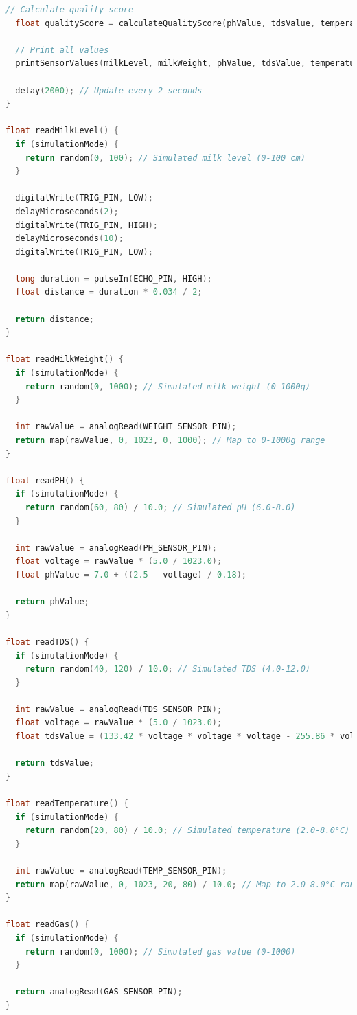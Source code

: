 \documentclass[12pt,a4paper]{article}
\begin{document}
\begin{lstlisting}[language=C++, basicstyle=\ttfamily\small, breaklines=true, frame=single, caption={Full Arduino Code for Milk Monitoring System}]
  // Calculate quality score
  float qualityScore = calculateQualityScore(phValue, tdsValue, temperature, gasValue);
  
  // Print all values
  printSensorValues(milkLevel, milkWeight, phValue, tdsValue, temperature, gasValue, qualityScore);
  
  delay(2000); // Update every 2 seconds
}

float readMilkLevel() {
  if (simulationMode) {
    return random(0, 100); // Simulated milk level (0-100 cm)
  }
  
  digitalWrite(TRIG_PIN, LOW);
  delayMicroseconds(2);
  digitalWrite(TRIG_PIN, HIGH);
  delayMicroseconds(10);
  digitalWrite(TRIG_PIN, LOW);
  
  long duration = pulseIn(ECHO_PIN, HIGH);
  float distance = duration * 0.034 / 2;
  
  return distance;
}

float readMilkWeight() {
  if (simulationMode) {
    return random(0, 1000); // Simulated milk weight (0-1000g)
  }
  
  int rawValue = analogRead(WEIGHT_SENSOR_PIN);
  return map(rawValue, 0, 1023, 0, 1000); // Map to 0-1000g range
}

float readPH() {
  if (simulationMode) {
    return random(60, 80) / 10.0; // Simulated pH (6.0-8.0)
  }
  
  int rawValue = analogRead(PH_SENSOR_PIN);
  float voltage = rawValue * (5.0 / 1023.0);
  float phValue = 7.0 + ((2.5 - voltage) / 0.18);
  
  return phValue;
}

float readTDS() {
  if (simulationMode) {
    return random(40, 120) / 10.0; // Simulated TDS (4.0-12.0)
  }
  
  int rawValue = analogRead(TDS_SENSOR_PIN);
  float voltage = rawValue * (5.0 / 1023.0);
  float tdsValue = (133.42 * voltage * voltage * voltage - 255.86 * voltage * voltage + 857.39 * voltage) * 0.5;
  
  return tdsValue;
}

float readTemperature() {
  if (simulationMode) {
    return random(20, 80) / 10.0; // Simulated temperature (2.0-8.0°C)
  }
  
  int rawValue = analogRead(TEMP_SENSOR_PIN);
  return map(rawValue, 0, 1023, 20, 80) / 10.0; // Map to 2.0-8.0°C range
}

float readGas() {
  if (simulationMode) {
    return random(0, 1000); // Simulated gas value (0-1000)
  }
  
  return analogRead(GAS_SENSOR_PIN);
}


\end{lstlisting}
\end{document}
